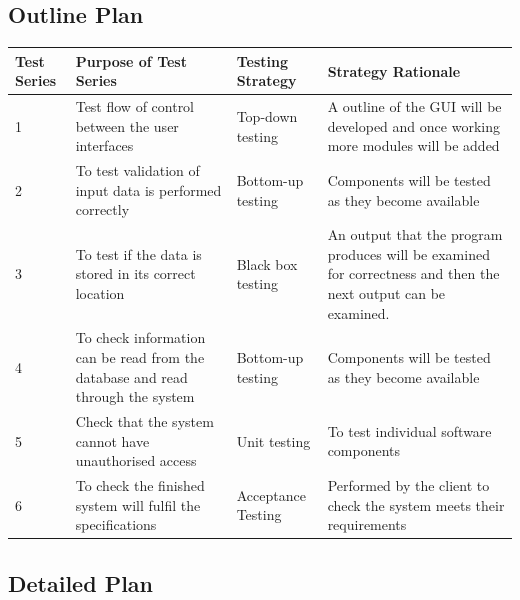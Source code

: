 \begin{landscape}
\subsection{Outline Plan}

\begin{center}
    \begin{tabular}{|p{2cm}|p{5cm}|p{5cm}|p{4cm}|}
        \hline
        \textbf{Test Series} & \textbf{Purpose of Test Series} & \textbf{Testing Strategy} & \textbf{Strategy Rationale}\\ \hline
1 & Test flow of control between the user interfaces & Top-down testing & A outline of the GUI will be developed and once working more modules will be added \\ \hline
       2 & To test validation of input data is performed correctly & Bottom-up testing & Components will be tested as they become available \\ \hline
3 & To test if the data is stored in its correct location & Black box testing & An output that the program produces will be examined for correctness and then the next output can be examined.\\ \hline
4 & To check information can be read from the database and read through the system & Bottom-up testing &  Components will be tested as they become available\\ \hline
5 & Check that the system cannot have unauthorised access & Unit testing & To test individual software components \\ \hline
6 & To check the finished system will fulfil the specifications &  Acceptance Testing & Performed by the client to check the system meets their requirements\\ \hline

    \end{tabular}
\end{center}

\subsection{Detailed Plan}


\end{landscape}
